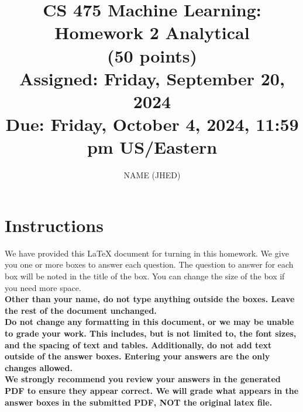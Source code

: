 \documentclass[11pt]{article}
\title{CS 475 Machine Learning: Homework 2 Analytical \\
(50 points)\\
\Large{Assigned: Friday, September 20, 2024} \\
\Large{Due: Friday, October 4, 2024, 11:59 pm US/Eastern}}
\author{NAME (JHED)}
\date{}
\renewcommand{\vec}[1]{\mathbf{#1}}
\begin{document}
\maketitle
\thispagestyle{headings}

\section*{Instructions }
We have provided this \LaTeX{} document for turning in this homework. We give you one or more boxes to answer each question.  The question to answer for each box will be noted in the title of the box.  You can change the size of the box if you need more space.\\

{\bf Other than your name, do not type anything outside the boxes. Leave the rest of the document unchanged.}\\


\textbf{Do not change any formatting in this document, or we may be unable to
  grade your work. This includes, but is not limited to, the font sizes, and the spacing of text and tables.  Additionally, do
  not add text outside of the answer boxes. Entering your answers are the only
  changes allowed.}\\


\textbf{We strongly recommend you review your answers in the generated PDF to
  ensure they appear correct. We will grade what appears in the answer boxes in
  the submitted PDF, NOT the original latex file.}

\end{document}
